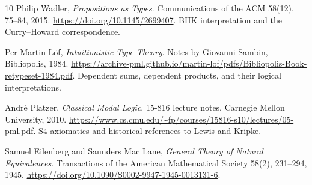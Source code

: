 \documentclass{article}
\begin{document}
\begin{thebibliography}{10}
Philip Wadler, \textit{Propositions as Types}.
Communications of the ACM 58(12), 75--84, 2015.
\url{https://doi.org/10.1145/2699407}.
BHK interpretation and the Curry--Howard correspondence.

Per Martin-L\"{o}f, \textit{Intuitionistic Type Theory}.
Notes by Giovanni Sambin, Bibliopolis, 1984.
\url{https://archive-pml.github.io/martin-lof/pdfs/Bibliopolis-Book-retypeset-1984.pdf}.
Dependent sums, dependent products, and their logical interpretations.

Andr\'{e} Platzer, \textit{Classical Modal Logic}.
15-816 lecture notes, Carnegie Mellon University, 2010.
\url{https://www.cs.cmu.edu/~fp/courses/15816-s10/lectures/05-pml.pdf}.
S4 axiomatics and historical references to Lewis and Kripke.

Samuel Eilenberg and Saunders Mac Lane,
\textit{General Theory of Natural Equivalences}.
Transactions of the American Mathematical Society 58(2), 231--294, 1945.
\url{https://doi.org/10.1090/S0002-9947-1945-0013131-6}.

\end{thebibliography}
\endgroup
\end{document}
